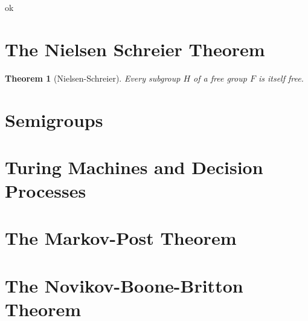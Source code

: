 \documentclass[12pt]{article}
\newtheorem{theorem}{Theorem}
\theoremstyle{definition}
\numberwithin{equation}{theorem}
\begin{document}
ok


\section{The Nielsen Schreier Theorem}
\begin{theorem}[Nielsen-Schreier]\label{thm:ns}
  Every subgroup $H$ of a free group $F$ is itself free.
\end{theorem}
\section{Semigroups}
\section{Turing Machines and Decision Processes}
\section{The Markov-Post Theorem}
\section{The Novikov-Boone-Britton Theorem}
\nocite{rotman1999introduction}



\end{document}
